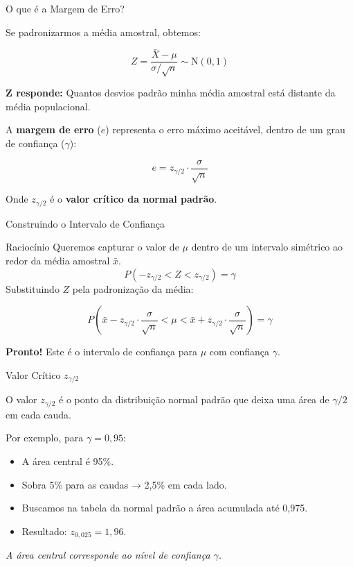 \documentclass[14pt,aspectratio=1610]{beamer}
\begin{document}
\begin{frame}{O que é a Margem de Erro?}
	\small
	\vspace{-0.3cm}
	\begin{block}{}
		\justifying
		Se padronizarmos a média amostral, obtemos:
		
		\[
		Z = \frac{\bar{X} - \mu}{\sigma / \sqrt{n}} \sim \text{N}(0,1)
		\]
		
		\textbf{Z responde:} Quantos desvios padrão minha média amostral está distante da média populacional.
		
		A \textbf{margem de erro} ($e$) representa o erro máximo aceitável, dentro de um grau de confiança ($\gamma$):
		
		\[
		e = z_{\gamma/2} \cdot \frac{\sigma}{\sqrt{n}}
		\]
		
		Onde $z_{\gamma/2}$ é o \textbf{valor crítico da normal padrão}.
	\end{block}
\end{frame}

\begin{frame}{Construindo o Intervalo de Confiança}
	\begin{block}{Raciocínio}
		\justifying
		Queremos capturar o valor de $\mu$ dentro de um intervalo simétrico ao redor da média amostral $\bar{x}$.
		\vspace{-0.3cm}
		\[
		P\left( -z_{\gamma/2} < Z < z_{\gamma/2} \right) = \gamma
		\]
			\vspace{-0.3cm}
		Substituindo $Z$ pela padronização da média:
		
		\[
		P\left( \bar{x} - z_{\gamma/2} \cdot \frac{\sigma}{\sqrt{n}} < \mu < \bar{x} + z_{\gamma/2} \cdot \frac{\sigma}{\sqrt{n}} \right) = \gamma
		\]
		
		\textbf{Pronto!} Este é o intervalo de confiança para $\mu$ com confiança $\gamma$.
	\end{block}
\end{frame}

\begin{frame}{Valor Crítico $z_{\gamma/2}$}
	\begin{block}{}
		\justifying
		O valor $z_{\gamma/2}$ é o ponto da distribuição normal padrão que deixa uma área de $\gamma/2$ em cada cauda.
		
		Por exemplo, para $\gamma = 0,95$:
		\begin{itemize}
			\item A área central é 95\%.
			\item Sobra 5\% para as caudas → 2,5\% em cada lado.
			\item Buscamos na tabela da normal padrão a área acumulada até 0,975.
			\item Resultado: $z_{0,025} = 1,96$.
		\end{itemize}
	\end{block}
	
	\centering
	
	\small\textit{A área central corresponde ao nível de confiança $\gamma$.}
\end{frame}
\end{document}
